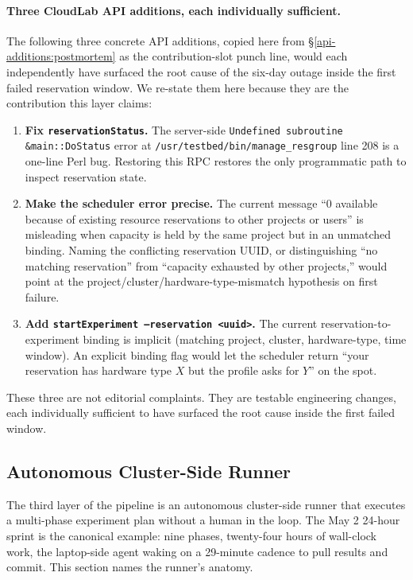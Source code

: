 \documentclass[11pt,a4paper]{article}
\begin{document}
\paragraph{Three CloudLab API additions, each individually sufficient.}
\label{api-additions:approach}
The following three concrete API additions, copied here from §\ref{api-additions:postmortem} as the contribution-slot punch line, would each independently have surfaced the root cause of the six-day outage inside the first failed reservation window. We re-state them here because they are the contribution this layer claims:
\begin{enumerate}[nosep,leftmargin=*]
    \item \textbf{Fix \texttt{reservationStatus}.} The server-side \texttt{Undefined subroutine \&main::DoStatus} error at \texttt{/usr/testbed/bin/manage\_resgroup} line 208 is a one-line Perl bug. Restoring this RPC restores the only programmatic path to inspect reservation state.
    \item \textbf{Make the scheduler error precise.} The current message ``0 available because of existing resource reservations to other projects or users'' is misleading when capacity is held by the same project but in an unmatched binding. Naming the conflicting reservation UUID, or distinguishing ``no matching reservation'' from ``capacity exhausted by other projects,'' would point at the project/cluster/hardware-type-mismatch hypothesis on first failure.
    \item \textbf{Add \texttt{startExperiment --reservation <uuid>}.} The current reservation-to-experiment binding is implicit (matching project, cluster, hardware-type, time window). An explicit binding flag would let the scheduler return ``your reservation has hardware type $X$ but the profile asks for $Y$'' on the spot.
\end{enumerate}
These three are not editorial complaints. They are testable engineering changes, each individually sufficient to have surfaced the root cause inside the first failed window.

\subsection{Autonomous Cluster-Side Runner}
\label{sec:approach:runner}

The third layer of the pipeline is an autonomous cluster-side runner that executes a multi-phase experiment plan without a human in the loop. The May 2 24-hour sprint is the canonical example: nine phases, twenty-four hours of wall-clock work, the laptop-side agent waking on a 29-minute cadence to pull results and commit. This section names the runner's anatomy.
\end{document}
